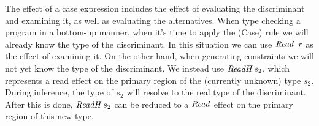 The effect of a case expression includes the effect of evaluating the discriminant and examining it, as well as evaluating the alternatives. When type checking a program in a bottom-up manner, when it's time to apply the (Case) rule we will already know the type of the discriminant. In this situation we can use $\iRead \ r$ as the effect of examining it. On the other hand, when generating constraints we will not yet know the type of the discriminant. We instead use $\operatorname{\mathit{ReadH}} s_2$, which represents a read effect on the primary region of the (currently unknown) type $s_2$. During inference, the type of $s_2$ will resolve to the real type of the discriminant. After this is done, $\operatorname{\mathit{ReadH}} s_2$ can be reduced to a $\operatorname{\mathit{Read}}$ effect on the primary region of this new type.

\clearpage{}
\bigskip
